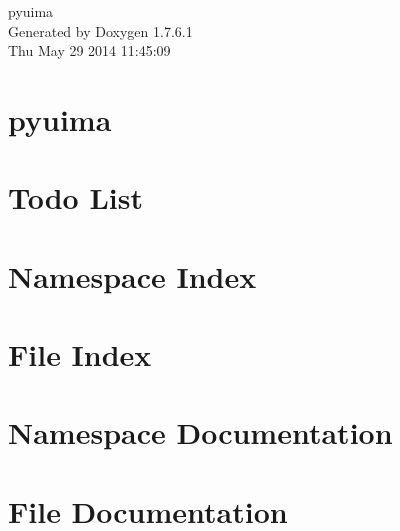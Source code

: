 \documentclass[a4paper]{book}
\begin{document}
\hypersetup{pageanchor=false,citecolor=blue}
\begin{titlepage}
\vspace*{7cm}
\begin{center}
{\Large pyuima }\\
\vspace*{1cm}
{\large \-Generated by Doxygen 1.7.6.1}\\
\vspace*{0.5cm}
{\small Thu May 29 2014 11:45:09}\\
\end{center}
\end{titlepage}
\clearemptydoublepage
{}
\tableofcontents
\clearemptydoublepage
{}
\hypersetup{pageanchor=true,citecolor=blue}
\chapter{pyuima}
\label{index}\hypertarget{index}{}
\chapter{\-Todo \-List}
\label{todo}
\hypertarget{todo}{}

\chapter{\-Namespace \-Index}

\chapter{\-File \-Index}

\chapter{\-Namespace \-Documentation}






\chapter{\-File \-Documentation}





\printindex
\end{document}
